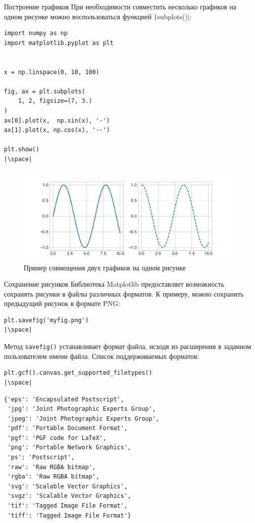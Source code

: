 \documentclass[aspectratio=169, mathserif]{beamer}	%
\begin{document}
\begin{frame}[fragile, label=m]{Построение графиков}
\scriptsize
При необходимости совместить несколько графиков на одном рисунке можно воспользоваться функцией \texttt|subplots()|:
\vfill
\begin{minipage}{.38\textwidth}
\begin{verbatim}
import numpy as np
import matplotlib.pyplot as plt


x = np.linspace(0, 10, 100)

fig, ax = plt.subplots(
    1, 2, figsize=(7, 3.)
)
ax[0].plot(x,  np.sin(x), '-')
ax[1].plot(x, np.cos(x), '--')

plt.show()
|\space|
\end{verbatim}
\end{minipage}
\begin{minipage}{.61\textwidth}
\begin{figure}[h!]
	\centering
	\includegraphics[width=1.1\linewidth]{./pics/double}
	\caption{Пример совмещения двух графиков на одном рисунке}
\end{figure}
\end{minipage}
\vfill
\end{frame}

\begin{frame}[fragile, label=m]{Сохранение рисунков}
\scriptsize
Библиотека Matplotlib предоставляет возможность сохранять рисунки в файлы различных форматов. К примеру, можно сохранить предыдущий рисунок в формате PNG:
\vfill
\begin{verbatim}
plt.savefig('myfig.png')
|\space|
\end{verbatim}
\vfill
Метод \texttt{savefig()} устанавливает формат файла, исходя из расширения в заданном пользователем имени файла. Список поддерживаемых форматов:
\vfill
\begin{verbatim}
plt.gcf().canvas.get_supported_filetypes()
|\space|
\end{verbatim}
\begin{verbatim}
{'eps': 'Encapsulated Postscript',
 'jpg': 'Joint Photographic Experts Group',
 'jpeg': 'Joint Photographic Experts Group',
 'pdf': 'Portable Document Format',
 'pgf': 'PGF code for LaTeX',
 'png': 'Portable Network Graphics',
 'ps': 'Postscript',
 'raw': 'Raw RGBA bitmap',
 'rgba': 'Raw RGBA bitmap',
 'svg': 'Scalable Vector Graphics',
 'svgz': 'Scalable Vector Graphics',
 'tif': 'Tagged Image File Format',
 'tiff': 'Tagged Image File Format'}
\end{verbatim}
\vfill
\end{frame}
\end{document}
